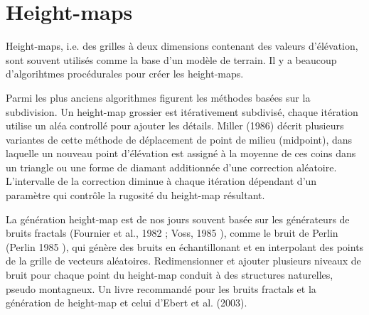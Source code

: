 \documentclass[11pt]{report}
\begin{document}
\section{Height-maps}

Height-maps, i.e. des grilles à deux dimensions contenant des valeurs d'élévation, sont souvent utilisés comme la base d'un modèle de terrain. Il y a beaucoup d'algorihtmes procédurales pour créer les height-maps. \newline

Parmi les plus anciens algorithmes figurent les méthodes basées sur la subdivision. Un height-map grossier est itérativement subdivisé, chaque itération utilise un aléa controllé pour ajouter les détails. Miller (1986) \cite{miller-86} décrit plusieurs variantes de cette méthode de déplacement de point de milieu (midpoint), dans laquelle un nouveau point d'élévation est assigné à la moyenne de ces coins dans un triangle ou une forme de diamant additionnée d'une correction aléatoire. L'intervalle de la correction diminue à chaque itération dépendant d'un paramètre qui contrôle la rugosité du height-map résultant. \newline

La génération height-map est de nos jours souvent basée sur les générateurs de bruits fractals (Fournier et al., 1982 \cite{fournier-82}; Voss, 1985 \cite{voss-85}), comme le bruit de Perlin (Perlin 1985 \cite{perlin-85}), qui génère des bruits en échantillonant et en interpolant des points de la grille de vecteurs aléatoires. Redimensionner et ajouter plusieurs niveaux de bruit pour chaque point du height-map conduit à des structures naturelles, pseudo montagneux. Un livre recommandé pour les bruits fractals et la génération de height-map et celui d'Ebert et al. (2003)\cite{ebert-03}.\newline
\end{document}
